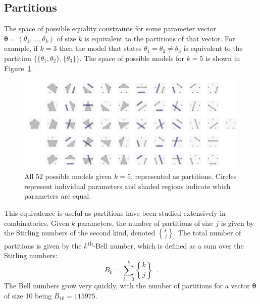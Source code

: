 \documentclass[11pt,a4paper]{article}
\theoremstyle{definition} %
\theoremstyle{case}
\DeclareRobustCommand{\stirling}{\genfrac\{\}{0pt}{}}
\newcommand{\bellnum}[1]{B_{#1}}
\newcommand{\FD}[1]{\todo[inline, color=pink]{ \textbf{FD}: #1 }}
\newcommand{\DB}[1]{\todo[inline, color=orange]{ \textbf{DB}: #1 }}
\begin{document}
\subsection{Partitions}
The space of possible equality constraints for some parameter vector $\mathbf{\theta} = (\theta_1, \ldots, \theta_k)$ of size $k$ is equivalent to the partitions of that vector. For example, if $k = 3$ then the model that states $\theta_1 = \theta_2 \neq \theta_3$ is equivalent to the partition $\{\{\theta_1, \theta_2\}, \{\theta_3\}\}$. The space of possible models for $k = 5$ is shown in Figure~\ref{fig:partitions}.

\begin{figure}
    \centering
    \includegraphics[width = \textwidth, keepaspectratio]{figures/modelspace_5_horizontal.pdf}
    \caption{All 52 possible models given $k = 5$, represented as partitions. Circles represent individual parameters and shaded regions indicate which parameters are equal.}
    \label{fig:partitions}
\end{figure}

This equivalence is useful as partitions have been studied extensively in combinatorics. Given $k$ parameters, the number of partitions of size $j$ is given by the Stirling numbers of the second kind, denoted $\stirling{k}{j}$. The total number of partitions is given by the $k$\textsuperscript{th}-Bell number, which is defined as a sum over the Stirling numbers:
\begin{equation}
    \bellnum{k} = \sum_{i = 0}^k \stirling{k}{j} \enspace .
\end{equation}
The Bell numbers grow very quickly, with the number of partitions for a vector $\mathbf{\theta}$ of size 10 being $B_{10} =115975$. %
\end{document}
